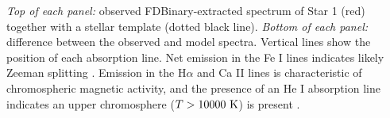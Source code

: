 \label{fig:emission1} \emph{Top of each panel:} observed FDBinary-extracted spectrum of Star 1 (red) together with a stellar template (dotted black line). \emph{Bottom of each panel:} difference between the observed and model spectra. Vertical lines show the position of each absorption line. Net emission in the Fe I lines indicates likely Zeeman splitting \citep{har73}. Emission in the H$\alpha$ and Ca II lines is characteristic of chromospheric magnetic activity, and the presence of an He I absorption line indicates an upper chromosphere ($T > 10000 \ \rm{K}$) is present \citep{fro12}.
  
  
  
  